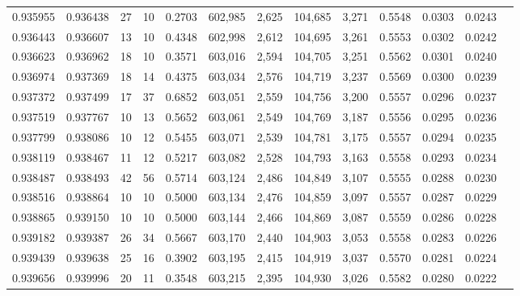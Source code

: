 \begin{tabular}{rrrrrrrrrrrrr}
0.935955 & 0.936438 &    27 &  10 &                                     0.2703 & 602,985 &   2,625 & 104,685 &   3,271 & 0.5548 & 0.0303 & 0.0243 \\
0.936443 & 0.936607 &    13 &  10 &                                     0.4348 & 602,998 &   2,612 & 104,695 &   3,261 & 0.5553 & 0.0302 & 0.0242 \\
0.936623 & 0.936962 &    18 &  10 &                                     0.3571 & 603,016 &   2,594 & 104,705 &   3,251 & 0.5562 & 0.0301 & 0.0240 \\
0.936974 & 0.937369 &    18 &  14 &                                     0.4375 & 603,034 &   2,576 & 104,719 &   3,237 & 0.5569 & 0.0300 & 0.0239 \\
0.937372 & 0.937499 &    17 &  37 &                                     0.6852 & 603,051 &   2,559 & 104,756 &   3,200 & 0.5557 & 0.0296 & 0.0237 \\
0.937519 & 0.937767 &    10 &  13 &                                     0.5652 & 603,061 &   2,549 & 104,769 &   3,187 & 0.5556 & 0.0295 & 0.0236 \\
0.937799 & 0.938086 &    10 &  12 &                                     0.5455 & 603,071 &   2,539 & 104,781 &   3,175 & 0.5557 & 0.0294 & 0.0235 \\
0.938119 & 0.938467 &    11 &  12 &                                     0.5217 & 603,082 &   2,528 & 104,793 &   3,163 & 0.5558 & 0.0293 & 0.0234 \\
0.938487 & 0.938493 &    42 &  56 &                                     0.5714 & 603,124 &   2,486 & 104,849 &   3,107 & 0.5555 & 0.0288 & 0.0230 \\
0.938516 & 0.938864 &    10 &  10 &                                     0.5000 & 603,134 &   2,476 & 104,859 &   3,097 & 0.5557 & 0.0287 & 0.0229 \\
0.938865 & 0.939150 &    10 &  10 &                                     0.5000 & 603,144 &   2,466 & 104,869 &   3,087 & 0.5559 & 0.0286 & 0.0228 \\
0.939182 & 0.939387 &    26 &  34 &                                     0.5667 & 603,170 &   2,440 & 104,903 &   3,053 & 0.5558 & 0.0283 & 0.0226 \\
0.939439 & 0.939638 &    25 &  16 &                                     0.3902 & 603,195 &   2,415 & 104,919 &   3,037 & 0.5570 & 0.0281 & 0.0224 \\
0.939656 & 0.939996 &    20 &  11 &                                     0.3548 & 603,215 &   2,395 & 104,930 &   3,026 & 0.5582 & 0.0280 & 0.0222 \\

\end{tabular}
